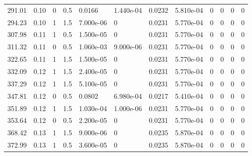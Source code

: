 \documentclass[preview]{standalone}
\begin{document}
{{{\begin{tabular}{L{1.2cm}C{1.2cm} C{0.3cm}C{0.5cm} C{1.4cm}C{1.4cm} C{1.4cm}C{1.4cm} C{1.6cm}C{1.6cm} C{1.6cm}C{1.6cm}}
  291.01  &  0.10  & 0     & 0.5 &  0.0166  & 1.440e-04  &  0.0232&   5.810e-04& 0 & 0   &  0 & 0  \\ 
  294.23  &  0.10  & 1     & 1.5 &  7.000e-06  & 0  &  0.0231&   5.770e-04& 0 & 0   &  0 & 0  \\ 
  307.98  &  0.11  & 1     & 0.5 &  1.500e-05  & 0  &  0.0231&   5.770e-04& 0 & 0   &  0 & 0  \\ 
  311.32  &  0.11  & 0     & 0.5 &  1.060e-03  & 9.000e-06  &  0.0231&   5.770e-04& 0 & 0   &  0 & 0  \\ 
  322.65  &  0.11  & 1     & 1.5 &  1.500e-05  & 0  &  0.0231&   5.770e-04& 0 & 0   &  0 & 0  \\ 
  332.09  &  0.12  & 1     & 1.5 &  2.400e-05  & 0  &  0.0231&   5.770e-04& 0 & 0   &  0 & 0  \\ 
  337.29  &  0.12  & 1     & 1.5 &  5.100e-05  & 0  &  0.0231&   5.770e-04& 0 & 0   &  0 & 0  \\ 
  347.81  &  0.12  & 0     & 0.5 &  0.0802  & 6.980e-04  &  0.0217&   5.410e-04& 0 & 0   &  0 & 0  \\ 
  351.89  &  0.12  & 1     & 1.5 &  1.030e-04  & 1.000e-06  &  0.0231&   5.770e-04& 0 & 0   &  0 & 0  \\ 
  353.64  &  0.12  & 0     & 0.5 &  2.200e-05  & 0  &  0.0231&   5.770e-04& 0 & 0   &  0 & 0  \\ 
  368.42  &  0.13  & 1     & 1.5 &  9.000e-06  & 0  &  0.0235&   5.870e-04& 0 & 0   &  0 & 0  \\ 
  372.99  &  0.13  & 1     & 0.5 &  3.600e-05  & 0  &  0.0235&   5.870e-04& 0 & 0   &  0 & 0  \\ 
\hline 
\end{tabular} 

}}}
\end{document}
